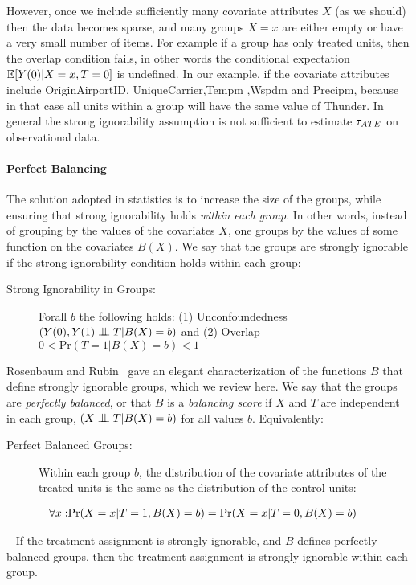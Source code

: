 However, once we include sufficiently many covariate attributes $X$
(as we should) then the data becomes sparse, and many groups $X=x$ are
either empty or have a very small number of items.  For example if a
group has only treated units, then the overlap condition fails, in
other words the conditional expectation $\mathbb{E}[Y(0)|X=x,T=0]$ is
undefined.
In our example, if the covariate attributes include OriginAirportID,
UniqueCarrier,Tempm ,Wspdm and Precipm, because in that case all units
within a group will have the same value of Thunder.  In general the
strong ignorability assumption is not sufficient to estimate ${\tau_{ATE}}$ on
observational data.

\paragraph*{Perfect Balancing}
The solution adopted in statistics is to increase the size of the
groups, while ensuring that strong ignorability holds {\em within each
  group}.  In other words, instead of grouping by the values of the
covariates $X$, one groups by the values of some function on the
covariates $B(X)$.  We say that the groups are strongly ignorable if
the strong ignorability condition holds within each group: 
\begin{description}
\item[Strong Ignorability in Groups:] Forall $b$ the following holds:
%
  \newline (1) Unconfoundedness $({Y(0), Y(1) \bigCI T} | B(X)=b)$ and
%
  \newline (2) Overlap $0 < \textrm{Pr}(T = 1 | B(X)=b) < 1$
\end{description}
Rosenbaum and Rubin~\cite{Rubin1983b} gave an elegant characterization
of the functions $B$ that define strongly ignorable groups, which we
review here.  We say that the groups are {\em perfectly balanced}, or
that $B$ is a {\em balancing score} if $X$ and $T$ are independent in
each group, \ie $({X \bigCI T} | B(X)=b)$ for all values $b$.
Equivalently: \vspace{-0.2cm}
\begin{description}
\item[Perfect Balanced Groups:] Within each group $b$, the
  distribution of the covariate attributes of the treated units is the
  same as the distribution of the control units:

\end{description}
{
 \begin{align}
 \forall x:  & \textrm{Pr}(X = x | T = 1, B(X)=b) =
         \textrm{Pr}(X = x | T = 0,B(X)=b) \hfill \label{eq:bs}
  \end{align}}
 \begin{theorem}~\cite[Th.3]{Rubin1983b} \label{the:sib} If the
  treatment assignment is strongly ignorable, and $B$ defines
  perfectly balanced groups, then the treatment assignment is strongly
  ignorable within each group.
\end{theorem}

